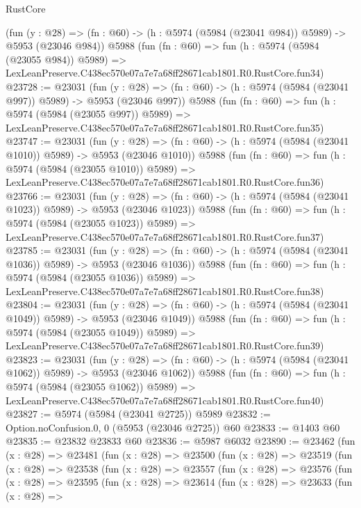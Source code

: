 \begin{lexlean}{RustCore}
\begin{coremodule}
    (fun (y : @28) => (fn : @60) -> (h : @5974 (@5984 (@23041 @984)) @5989) -> @5953 (@23046 @984))
    @5988
    (fun (fn : @60) =>
    fun (h : @5974 (@5984 (@23055 @984)) @5989) =>
    LexLeanPreserve.C438ec570e07a7e7a68ff28671cab1801.R0.RustCore.fun34)
@23728 := @23031
    (fun (y : @28) => (fn : @60) -> (h : @5974 (@5984 (@23041 @997)) @5989) -> @5953 (@23046 @997))
    @5988
    (fun (fn : @60) =>
    fun (h : @5974 (@5984 (@23055 @997)) @5989) =>
    LexLeanPreserve.C438ec570e07a7e7a68ff28671cab1801.R0.RustCore.fun35)
@23747 := @23031
    (fun (y : @28) =>
    (fn : @60) -> (h : @5974 (@5984 (@23041 @1010)) @5989) -> @5953 (@23046 @1010))
    @5988
    (fun (fn : @60) =>
    fun (h : @5974 (@5984 (@23055 @1010)) @5989) =>
    LexLeanPreserve.C438ec570e07a7e7a68ff28671cab1801.R0.RustCore.fun36)
@23766 := @23031
    (fun (y : @28) =>
    (fn : @60) -> (h : @5974 (@5984 (@23041 @1023)) @5989) -> @5953 (@23046 @1023))
    @5988
    (fun (fn : @60) =>
    fun (h : @5974 (@5984 (@23055 @1023)) @5989) =>
    LexLeanPreserve.C438ec570e07a7e7a68ff28671cab1801.R0.RustCore.fun37)
@23785 := @23031
    (fun (y : @28) =>
    (fn : @60) -> (h : @5974 (@5984 (@23041 @1036)) @5989) -> @5953 (@23046 @1036))
    @5988
    (fun (fn : @60) =>
    fun (h : @5974 (@5984 (@23055 @1036)) @5989) =>
    LexLeanPreserve.C438ec570e07a7e7a68ff28671cab1801.R0.RustCore.fun38)
@23804 := @23031
    (fun (y : @28) =>
    (fn : @60) -> (h : @5974 (@5984 (@23041 @1049)) @5989) -> @5953 (@23046 @1049))
    @5988
    (fun (fn : @60) =>
    fun (h : @5974 (@5984 (@23055 @1049)) @5989) =>
    LexLeanPreserve.C438ec570e07a7e7a68ff28671cab1801.R0.RustCore.fun39)
@23823 := @23031
    (fun (y : @28) =>
    (fn : @60) -> (h : @5974 (@5984 (@23041 @1062)) @5989) -> @5953 (@23046 @1062))
    @5988
    (fun (fn : @60) =>
    fun (h : @5974 (@5984 (@23055 @1062)) @5989) =>
    LexLeanPreserve.C438ec570e07a7e7a68ff28671cab1801.R0.RustCore.fun40)
@23827 := @5974 (@5984 (@23041 @2725)) @5989
@23832 := Option.noConfusion.{0, 0} (@5953 (@23046 @2725)) @60
@23833 := @1403 @60
@23835 := @23832 @23833 @60
@23836 := @5987 @6032
@23890 := @23462
    (fun (x : @28) =>
    @23481
      (fun (x : @28) =>
      @23500
        (fun (x : @28) =>
        @23519
          (fun (x : @28) =>
          @23538
            (fun (x : @28) =>
            @23557
              (fun (x : @28) =>
              @23576
                (fun (x : @28) =>
                @23595
                  (fun (x : @28) =>
                  @23614
                    (fun (x : @28) =>
                    @23633
                      (fun (x : @28) =>

\end{coremodule}
\end{lexlean}
